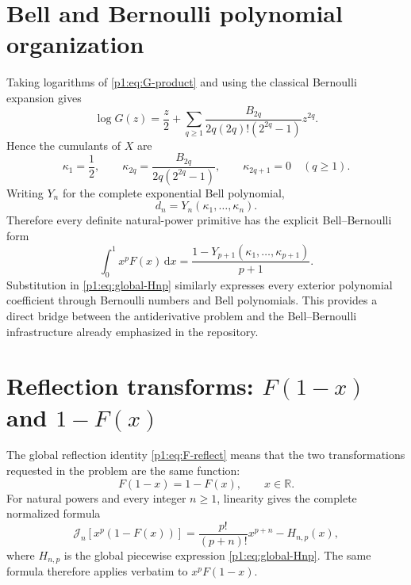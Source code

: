\documentclass[11pt,oneside]{article}
\theoremstyle{definition}
\theoremstyle{remark}
\newcommand{\R}{\mathbb R}
\newcommand{\dd}{\,\mathrm d}
\newcommand{\Jn}{\mathcal J}
\newcommand{\1}{\mathbf 1}
\begin{document}
\section{Bell and Bernoulli polynomial organization}

Taking logarithms of \eqref{p1:eq:G-product} and using the classical Bernoulli
expansion gives
\begin{equation}
 \log G(z)=\frac z2+
 \sum_{q\geq1}
 \frac{B_{2q}}{2q(2q)!(2^{2q}-1)}z^{2q}.                       \label{p1:eq:logG-Bernoulli}
\end{equation}
Hence the cumulants of \(X\) are
\begin{equation}
 \kappa_1=\frac12,\qquad
 \kappa_{2q}=\frac{B_{2q}}{2q(2^{2q}-1)},\qquad
 \kappa_{2q+1}=0\quad(q\geq1).                                \label{p1:eq:cumulants}
\end{equation}
Writing \(Y_n\) for the complete exponential Bell polynomial,
\begin{equation}
 d_n=Y_n(\kappa_1,\ldots,\kappa_n).                             \label{p1:eq:d-Bell}
\end{equation}
Therefore every definite natural-power primitive has the explicit
Bell--Bernoulli form
\begin{equation}
 \int_0^1x^pF(x)\dd x
 =\frac{1-Y_{p+1}(\kappa_1,\ldots,\kappa_{p+1})}{p+1}.          \label{p1:eq:A-Bell}
\end{equation}
Substitution in \eqref{p1:eq:global-Hnp} similarly expresses every exterior
polynomial coefficient through Bernoulli numbers and Bell polynomials.  This
provides a direct bridge between the antiderivative problem and the
Bell--Bernoulli infrastructure already emphasized in the repository.

\section{Reflection transforms: \texorpdfstring{$F(1-x)$}{F(1-x)} and
\texorpdfstring{$1-F(x)$}{1-F(x)}}

The global reflection identity \eqref{p1:eq:F-reflect} means that the two
transformations requested in the problem are the same function:
\begin{equation}
 F(1-x)=1-F(x),\qquad x\in\R.                                  \label{p1:eq:transforms-same}
\end{equation}
For natural powers and every integer \(n\geq1\), linearity gives the complete
normalized formula
\begin{equation}
 \boxed{\quad
 \Jn_n[x^p(1-F(x))]
 =\frac{p!}{(p+n)!}x^{p+n}-H_{n,p}(x),
 \quad}                                                        \label{p1:eq:complement-np}
\end{equation}
where \(H_{n,p}\) is the global piecewise expression
\eqref{p1:eq:global-Hnp}.  The same formula therefore applies verbatim to
\(x^pF(1-x)\).
\end{document}
